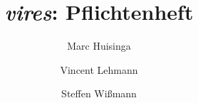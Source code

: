 \documentclass[a4paper,titlepage]{article}
\begin{document}
\newcommand{\vires}{\textbf{\textit{vires}}}

\author{Marc Huisinga \and Vincent Lehmann \and Steffen Wißmann}
\title{\vires: Pflichtenheft}

\maketitle
\tableofcontents

\begin{abstract}

\end{abstract}















\end{document}
